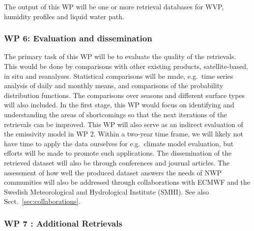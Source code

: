 \documentclass[12pt,oneside,a4paper]{article}
\begin{document}
The output of this WP will be one or more retrieval databases for WVP, humidity
profiles and liquid water path.
\vspace{-1.0ex}

\subsubsection*{WP 6: Evaluation and dissemination}
%
\label{sec:evaluation}
The primary task of this WP will be to evaluate the quality of the retrievals.
This would be done by comparisons with other existing products,
satellite-based, in situ and reanalyses. Statistical comparisons will be made,
e.g.\, time series analysis of daily and monthly means, and comparisons of the
probability distribution functions. The comparisons over seasons and different
surface types will also included. In the first stage, this WP would focus on
identifying and understanding the areas of shortcomings so that the next
iterations of the retrievals can be improved. This WP will also serve as an
indirect evaluation of the emissivity model in WP 2. Within a two-year time
frame, we will likely not have time to apply the data ourselves for e.g.\
climate model evaluation, but efforts will be made to promote such applications.
The dissemination of the retrieved dataset will also be through conferences and
journal articles. The assessment of how well the produced dataset answers the
needs of NWP communities will also be addressed through collaborations with
ECMWF and the Swedish Meteorological and Hydrological Institute (SMHI). See
also Sect.~\ref{sec:collaborations}.
\vspace{-1.0ex}
\subsubsection*{WP 7 : Additional Retrievals}
%
\label{sec:other_retrievals}
\end{document}
